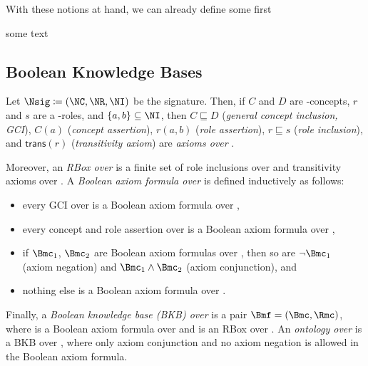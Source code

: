 With these notions at hand, we can already define some first 

some text

\begin{example}
  
\end{example}




\subsection{Boolean Knowledge Bases}
\label{sec:dl-axioms}


\begin{definition}
  Let $\Nsig\coloneqq(\NC,\NR,\NI)$ be the signature. Then, if $C$ and $D$ are \Nsig-concepts, $r$
  and $s$ are a \Nsig-roles, and $\{a,b\}\subseteq\NI$, then $C \sqsubseteq D$ (\emph{general concept inclusion,
    GCI}), $C(a)$ (\emph{concept assertion}), $r(a,b)$ (\emph{role assertion}), $r \sqsubseteq s$
  (\emph{role inclusion}), and $\mathsf{trans}(r)$ (\emph{transitivity axiom}) are
  \emph{axioms over \Nsig}.

  Moreover, an \emph{RBox \Rmc over \Nsig} is a finite set of role inclusions over \Nsig and
  transitivity axioms over \Nsig. A \emph{Boolean axiom formula over \Nsig} is defined inductively
  as follows:
  \begin{itemize}
  \item every GCI over \Nsig is a Boolean axiom formula over \Nsig,
  \item every concept and role assertion over \Nsig is a Boolean axiom formula over \Nsig,
  \item if $\Bmc_{1}$, $\Bmc_{2}$ are Boolean axiom formulas over \Nsig, then so are $\lnot\Bmc_{1}$
    (axiom negation) and $\Bmc_{1}\land\Bmc_{2}$ (axiom conjunction), and
  \item nothing else is a Boolean axiom formula over \Nsig.
  \end{itemize}

  Finally, a \emph{Boolean knowledge base (BKB) over \Nsig} is a pair $\Bmf = (\Bmc, \Rmc)$, where
  \Bmc is a Boolean axiom formula over \Nsig and \Rmc is an RBox over \Nsig. An \emph{ontology over
    \Nsig} is a BKB over \Nsig, where only axiom conjunction and no axiom negation is allowed in the
  Boolean axiom formula.
\end{definition}

